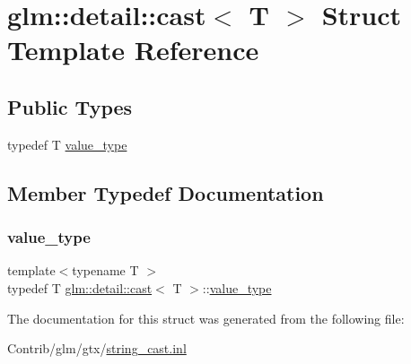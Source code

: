 \hypertarget{structglm_1_1detail_1_1cast}{}\section{glm\+:\+:detail\+:\+:cast$<$ T $>$ Struct Template Reference}
\label{structglm_1_1detail_1_1cast}
\subsection*{Public Types}
\begin{DoxyCompactItemize}
\item 
typedef T \mbox{\hyperlink{structglm_1_1detail_1_1cast_aee0fcb3ea7c887fbc9fbe700a8b758b7}{value\+\_\+type}}
\end{DoxyCompactItemize}


\subsection{Member Typedef Documentation}
\mbox{\label{structglm_1_1detail_1_1cast_aee0fcb3ea7c887fbc9fbe700a8b758b7}} 
\subsubsection{\texorpdfstring{value\+\_\+type}{value\_type}}
{\footnotesize\ttfamily template$<$typename T $>$ \\
typedef T \mbox{\hyperlink{structglm_1_1detail_1_1cast}{glm\+::detail\+::cast}}$<$ T $>$\+::\mbox{\hyperlink{structglm_1_1detail_1_1cast_aee0fcb3ea7c887fbc9fbe700a8b758b7}{value\+\_\+type}}}



The documentation for this struct was generated from the following file\+:\begin{DoxyCompactItemize}
\item 
Contrib/glm/gtx/\mbox{\hyperlink{string__cast_8inl}{string\+\_\+cast.\+inl}}\end{DoxyCompactItemize}
